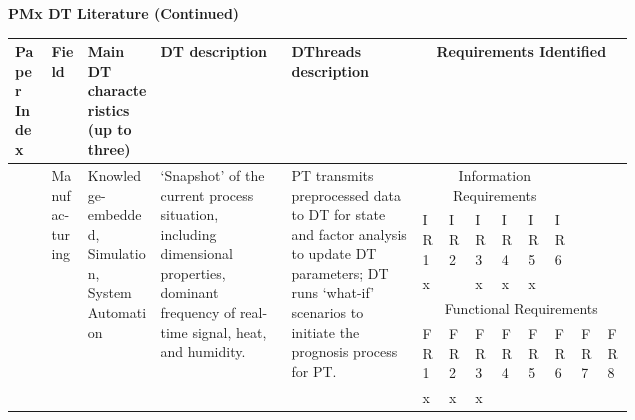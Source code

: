\documentclass[runningheads]{llncs}
\begin{document}
\begin{landscape}
\begin{small}
\begin{longtable}
                \end{longtable}
        \end{small}

        \newpage
        \textbf{PMx DT Literature (Continued)}
        \vspace{2mm}
        
        \begin{small}
    \begin{longtable}{p{0.05\linewidth}p{0.05\linewidth}p{0.1\linewidth}p{0.18\linewidth}p{0.18\linewidth}p{0.02\linewidth}p{0.02\linewidth}p{0.02\linewidth}p{0.02\linewidth}p{0.02\linewidth}p{0.02\linewidth}p{0.02\linewidth}p{0.02\linewidth}}
    \bottomrule
        Paper Index & Field & Main DT characteristics (up to three) & DT description & DThreads description & \multicolumn{8}{c}{Requirements Identified} \\\bottomrule

        \vspace{3mm}
        \multirow{6}{=}{\cite{cohen2021smart}} & \multirow{6}{=}{Manufac-turing} &  \multirow{6}{=}{Knowledge-embedded, Simulation, System Automation} & \multirow{6}{=}{`Snapshot' of the current process situation, including dimensional properties, dominant frequency of real-time signal, heat, and humidity.} & \multirow{6}{=}{PT transmits preprocessed data to DT for state and factor analysis to update DT parameters; DT runs `what-if' scenarios to initiate the prognosis process for PT.} & \multicolumn{6}{c}{Information Requirements} &  \\\cmidrule{6-11}
        & & & & & IR1 & IR2 & IR3 & IR4 & IR5 & IR6 & & \\\cmidrule{6-11}
        & & & & & x &  & x & x & x &  & & \\\cmidrule{6-13}
        \vspace{3mm}
        & & & & & \multicolumn{8}{c}{Functional Requirements} \\\cmidrule{6-13}
        & & & & & FR1 & FR2 & FR3 & FR4 & FR5 & FR6 & FR7 & FR8 \\\cmidrule{6-13}
        & & & & & x & x & x &  &  &  & & \\\bottomrule
        

\end{longtable}
\end{small}
\end{landscape}
\end{document}
